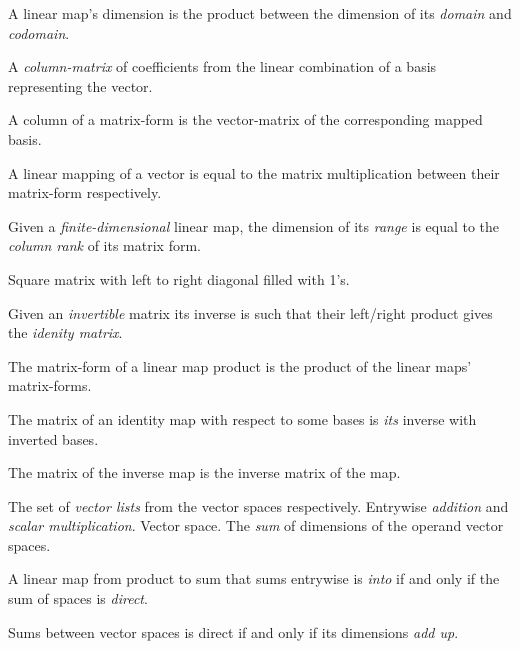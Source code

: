 \begin{multicols}{3}
  A linear map's dimension is the product between the dimension of its \textit{domain} and \textit{codomain}.

  A \textit{column-matrix} of coefficients from the linear combination of a basis representing the vector.

  A column of a matrix-form is the vector-matrix of the corresponding mapped basis.
  
  A linear mapping of a vector is equal to the matrix multiplication between their matrix-form respectively.
  
  Given a \textit{finite-dimensional} linear map,
  the dimension of its \textit{range} is equal to
  the \textit{column rank} of its matrix form.
  
  Square matrix with left to right diagonal filled with 1's.

  Given an \textit{invertible} matrix its inverse is such that their left/right product gives the \textit{idenity matrix}.

  The matrix-form of a linear map product is the product of the linear maps' matrix-forms.
  
  The matrix of an identity map with respect to some bases is
  \textit{its} inverse with inverted bases.
  
    
  The matrix of the inverse map is the inverse matrix of the map.


  The set of \textit{vector lists} from the vector spaces respectively.
  Entrywise \textit{addition} and \textit{scalar multiplication}.
   Vector space.
  The \textit{sum} of dimensions of the operand vector spaces.

  A linear map from product to sum that sums entrywise is
  \textit{into} if and only if the sum of spaces is \textit{direct}.

  Sums between vector spaces is direct if and only if its dimensions \textit{add up}.


\end{multicols}
